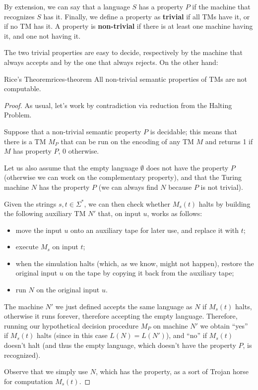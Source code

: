 \noindent By extension, we can say that a language \(S\) has a property \(P\) if the machine that recognizes \(S\) has it. Finally, we define a property as \textbf{trivial} if all TMs have it, or if no TM has it. A property is \textbf{non-trivial} if there is at least one machine having it, and one not having it.

The two trivial properties are easy to decide, respectively by the machine that always accepts and by the one that always rejects. On the other hand:

\begin{theorem}{Rice's Theorem}{rices-theorem}
    All non-trivial semantic properties of TMs are not computable.
    \begin{proof}
        As usual, let's work by contradiction via reduction from the Halting Problem.
        
        Suppose that a non-trivial semantic property \(P\) is decidable; this means that there is a TM \(M_P\) that can be run on the encoding of any TM \(M\) and returns 1 if \(M\) has property \(P\), 0 otherwise.
        
        Let us also assume that the empty language \(\emptyset\) does not have the property \(P\) (otherwise we can work on the complementary property), and that the Turing machine \(N\) has the property \(P\) (we can always find \(N\) because \(P\) is not trivial).
        
        Given the strings \(s, t \in \Sigma^*\), we can then check whether \(M_s(t)\) halts by building the following auxiliary TM \(N'\) that, on input \(u\), works as follows:
        \begin{itemize}
            \item move the input \(u\) onto an auxiliary tape for later use, and replace it with \(t\);
            \item execute \(M_s\) on input \(t\);
            \item when the simulation halts (which, as we know, might not happen), restore the original input \(u\) on the tape by copying it back from the auxiliary tape;
            \item run \(N\) on the original input \(u\).
        \end{itemize}
        The machine \(N'\) we just defined accepts the same language as \(N\) if \(M_s(t)\) halts, otherwise it runs forever, therefore accepting the empty language. Therefore, running our hypothetical decision procedure \(M_P\) on machine \(N'\) we obtain ``yes'' if \(M_s(t)\) halts (since in this case \(L(N) = L(N')\)), and ``no'' if \(M_s(t)\) doesn't halt (and thus the empty language, which doesn't have the property \(P\), is recognized).
        
        Observe that we simply use \(N\), which has the property, as a sort of Trojan horse for computation \(M_s(t)\).
    \end{proof}
\end{theorem}

